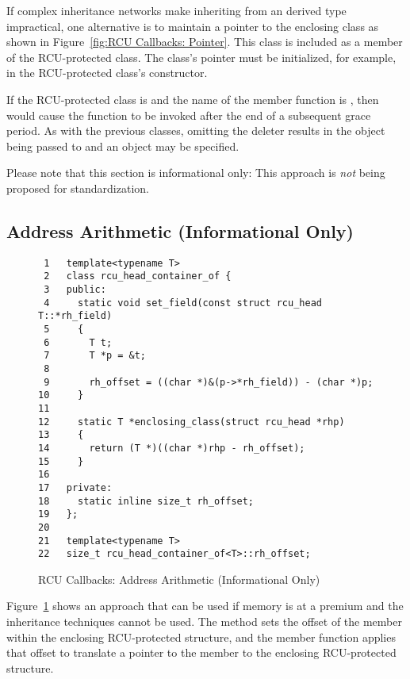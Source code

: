 \documentclass[letterpaper,10pt]{article}
\begin{document}
If complex inheritance networks make inheriting from an
 derived type impractical, one alternative is
to maintain a pointer to the enclosing class as shown in
Figure~\ref{fig:RCU Callbacks: Pointer}.
This  class is included as a member of the RCU-protected
class.
The  class's pointer must be initialized, for example,
in the RCU-protected class's constructor.

If the RCU-protected class is  and the name of the
 member function is , then
 would cause the function  to be
invoked after the end of a subsequent grace period.
As with the previous classes, omitting the deleter results
in the object being passed to  and an 
object may be specified.

Please note that this section is informational only: This approach
is \emph{not} being proposed for standardization.

\subsection{Address Arithmetic (Informational Only)}
\label{sec:Address Arithmetic}

\begin{figure}[tbp]
{ \scriptsize
\begin{verbatim}
 1   template<typename T>
 2   class rcu_head_container_of {
 3   public:
 4     static void set_field(const struct rcu_head T::*rh_field)
 5     {
 6       T t;
 7       T *p = &t;
 8
 9       rh_offset = ((char *)&(p->*rh_field)) - (char *)p;
10     }
11
12     static T *enclosing_class(struct rcu_head *rhp)
13     {
14       return (T *)((char *)rhp - rh_offset);
15     }
16
17   private:
18     static inline size_t rh_offset;
19   };
20
21   template<typename T>
22   size_t rcu_head_container_of<T>::rh_offset;
\end{verbatim}
}
\caption{RCU Callbacks: Address Arithmetic (Informational Only)}
\label{fig:RCU Callbacks: Address Arithmetic}
\end{figure}

Figure~\ref{fig:RCU Callbacks: Address Arithmetic}
shows an approach that can be used if memory is at a premium and
the inheritance techniques cannot be used.
The  method sets the offset of the
 member within the enclosing RCU-protected
structure, and the  member function
applies that offset to translate a pointer to the
 member to the enclosing RCU-protected structure.
\end{document}
